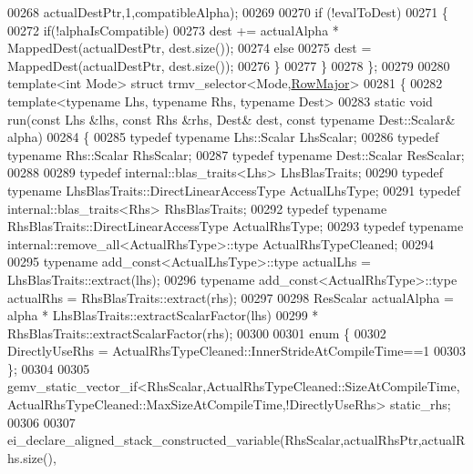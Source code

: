 \begin{DoxyCode}
00268             actualDestPtr,1,compatibleAlpha);
00269 
00270     \textcolor{keywordflow}{if} (!evalToDest)
00271     \{
00272       \textcolor{keywordflow}{if}(!alphaIsCompatible)
00273         dest += actualAlpha * MappedDest(actualDestPtr, dest.size());
00274       \textcolor{keywordflow}{else}
00275         dest = MappedDest(actualDestPtr, dest.size());
00276     \}
00277   \}
00278 \};
00279 
00280 \textcolor{keyword}{template}<\textcolor{keywordtype}{int} Mode> \textcolor{keyword}{struct }trmv\_selector<Mode,\hyperlink{group__enums_ggaacded1a18ae58b0f554751f6cdf9eb13acfcde9cd8677c5f7caf6bd603666aae3}{RowMajor}>
00281 \{
00282   \textcolor{keyword}{template}<\textcolor{keyword}{typename} Lhs, \textcolor{keyword}{typename} Rhs, \textcolor{keyword}{typename} Dest>
00283   \textcolor{keyword}{static} \textcolor{keywordtype}{void} run(\textcolor{keyword}{const} Lhs &lhs, \textcolor{keyword}{const} Rhs &rhs, Dest& dest, \textcolor{keyword}{const} \textcolor{keyword}{typename} Dest::Scalar& alpha)
00284   \{
00285     \textcolor{keyword}{typedef} \textcolor{keyword}{typename} Lhs::Scalar      LhsScalar;
00286     \textcolor{keyword}{typedef} \textcolor{keyword}{typename} Rhs::Scalar      RhsScalar;
00287     \textcolor{keyword}{typedef} \textcolor{keyword}{typename} Dest::Scalar     ResScalar;
00288     
00289     \textcolor{keyword}{typedef} internal::blas\_traits<Lhs> LhsBlasTraits;
00290     \textcolor{keyword}{typedef} \textcolor{keyword}{typename} LhsBlasTraits::DirectLinearAccessType ActualLhsType;
00291     \textcolor{keyword}{typedef} internal::blas\_traits<Rhs> RhsBlasTraits;
00292     \textcolor{keyword}{typedef} \textcolor{keyword}{typename} RhsBlasTraits::DirectLinearAccessType ActualRhsType;
00293     \textcolor{keyword}{typedef} \textcolor{keyword}{typename} internal::remove\_all<ActualRhsType>::type ActualRhsTypeCleaned;
00294 
00295     \textcolor{keyword}{typename} add\_const<ActualLhsType>::type actualLhs = LhsBlasTraits::extract(lhs);
00296     \textcolor{keyword}{typename} add\_const<ActualRhsType>::type actualRhs = RhsBlasTraits::extract(rhs);
00297 
00298     ResScalar actualAlpha = alpha * LhsBlasTraits::extractScalarFactor(lhs)
00299                                   * RhsBlasTraits::extractScalarFactor(rhs);
00300 
00301     \textcolor{keyword}{enum} \{
00302       DirectlyUseRhs = ActualRhsTypeCleaned::InnerStrideAtCompileTime==1
00303     \};
00304 
00305     
      gemv\_static\_vector\_if<RhsScalar,ActualRhsTypeCleaned::SizeAtCompileTime,ActualRhsTypeCleaned::MaxSizeAtCompileTime,!DirectlyUseRhs> static\_rhs;
00306 
00307     ei\_declare\_aligned\_stack\_constructed\_variable(RhsScalar,actualRhsPtr,actualRhs.size(),

\end{DoxyCode}
